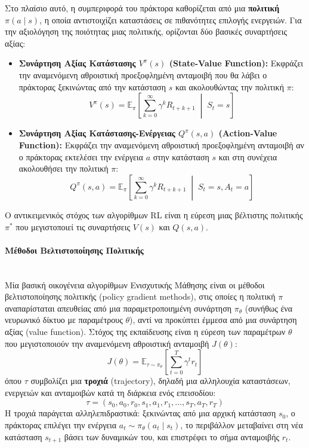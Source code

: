 \documentclass[12pt]{article}
\begin{document}
Στο πλαίσιο αυτό, η συμπεριφορά του πράκτορα καθορίζεται από μια \textbf{πολιτική} $\pi(a \mid s)$, η οποία αντιστοιχίζει καταστάσεις σε πιθανότητες επιλογής ενεργειών. Για την αξιολόγηση της ποιότητας μιας πολιτικής, ορίζονται δύο βασικές συναρτήσεις αξίας:
\begin{itemize}
	\item \textbf{Συνάρτηση Αξίας Κατάστασης $V^{\pi}(s)$ (State-Value Function):} Εκφράζει την αναμενόμενη αθροιστική προεξοφλημένη ανταμοιβή που θα λάβει ο πράκτορας ξεκινώντας από την κατάσταση $s$ και ακολουθώντας την πολιτική $\pi$:
	\[
	V^{\pi}(s) = \mathbb{E}_{\pi} \left[ \sum_{k=0}^{\infty} \gamma^k R_{t+k+1} \;\middle|\; S_t = s \right]
	\]
	\item \textbf{Συνάρτηση Αξίας Κατάστασης-Ενέργειας $Q^{\pi}(s, a)$ (Action-Value Function):} Εκφράζει την αναμενόμενη αθροιστική προεξοφλημένη ανταμοιβή αν ο πράκτορας εκτελέσει την ενέργεια $a$ στην κατάσταση $s$ και στη συνέχεια ακολουθήσει την πολιτική $\pi$:
	\[
	Q^{\pi}(s, a) = \mathbb{E}_{\pi} \left[ \sum_{k=0}^{\infty} \gamma^k R_{t+k+1} \;\middle|\; S_t = s, A_t = a \right]
	\]
\end{itemize}
Ο αντικειμενικός στόχος των αλγορίθμων RL είναι η εύρεση μιας βέλτιστης πολιτικής $\pi^*$ που μεγιστοποιεί τις συναρτήσεις $V(s)$ και $Q(s, a)$.

\paragraph{Μέθοδοι Βελτιστοποίησης Πολιτικής}~\\
Μία βασική οικογένεια αλγορίθμων Ενισχυτικής Μάθησης είναι οι μέθοδοι βελτιστοποίησης πολιτικής (policy gradient methods), στις οποίες η πολιτική $\pi$ αναπαρίσταται απευθείας από μια παραμετροποιημένη συνάρτηση $\pi_\theta$ (συνήθως ένα νευρωνικό δίκτυο με παραμέτρους $\theta$), αντί να προκύπτει έμμεσα από μια συνάρτηση αξίας (value function). Στόχος της εκπαίδευσης είναι η εύρεση των παραμέτρων $\theta$ που μεγιστοποιούν την αναμενόμενη αθροιστική ανταμοιβή $J(\theta)$:
\[
J(\theta) = \mathbb{E}_{\tau \sim \pi_\theta} \left[ \sum_{t=0}^{T} \gamma^t r_t \right]
\]
όπου $\tau$ συμβολίζει μια \textbf{τροχιά} (trajectory), δηλαδή μια αλληλουχία καταστάσεων, ενεργειών και ανταμοιβών κατά τη διάρκεια ενός επεισοδίου:
\[
\tau = (s_0, a_0, r_0, s_1, a_1, r_1, \dots, s_T, a_T, r_T)
\]
Η τροχιά παράγεται αλληλεπιδραστικά: ξεκινώντας από μια αρχική κατάσταση $s_0$, ο πράκτορας επιλέγει την ενέργεια $a_t \sim \pi_\theta(a_t \mid s_t)$, το περιβάλλον μεταβαίνει στη νέα κατάσταση $s_{t+1}$ βάσει των δυναμικών του, και επιστρέφει το σήμα ανταμοιβής $r_t$.
\end{document}
